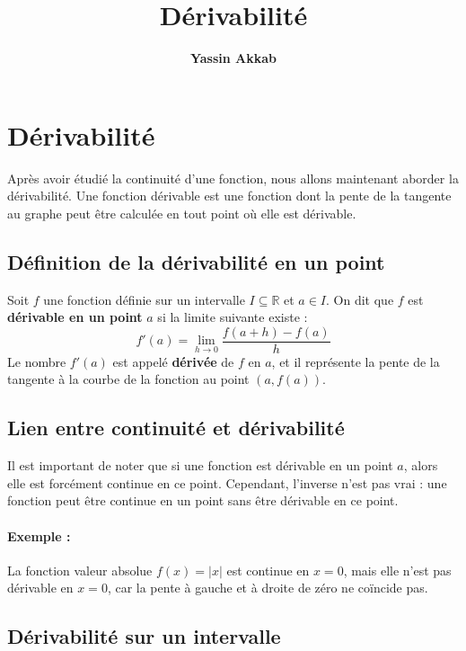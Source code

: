 \documentclass{article}
\title{\textbf{Dérivabilité}}
\author{\textbf{Yassin Akkab}}
\begin{document}
	
	\maketitle
	
	
	
	\tableofcontents
	
	\newpage
	
	
	\section{Dérivabilité}
	
	Après avoir étudié la continuité d'une fonction, nous allons maintenant aborder la dérivabilité. Une fonction dérivable est une fonction dont la pente de la tangente au graphe peut être calculée en tout point où elle est dérivable.
	
	\subsection{Définition de la dérivabilité en un point}
	
	Soit \( f \) une fonction définie sur un intervalle \( I \subseteq \mathbb{R} \) et \( a \in I \). On dit que \( f \) est \textbf{dérivable en un point} \( a \) si la limite suivante existe :
	\[
	f'(a) = \lim_{h \to 0} \frac{f(a+h) - f(a)}{h}
	\]
	Le nombre \( f'(a) \) est appelé \textbf{dérivée} de \( f \) en \( a \), et il représente la pente de la tangente à la courbe de la fonction au point \( (a, f(a)) \).
	
	\subsection{Lien entre continuité et dérivabilité}
	
	Il est important de noter que si une fonction est dérivable en un point \( a \), alors elle est forcément continue en ce point. Cependant, l'inverse n'est pas vrai : une fonction peut être continue en un point sans être dérivable en ce point.
	
	\paragraph{Exemple :} La fonction valeur absolue \( f(x) = |x| \) est continue en \( x = 0 \), mais elle n'est pas dérivable en \( x = 0 \), car la pente à gauche et à droite de zéro ne coïncide pas.
	
	\subsection{Dérivabilité sur un intervalle}
	
\end{document}
